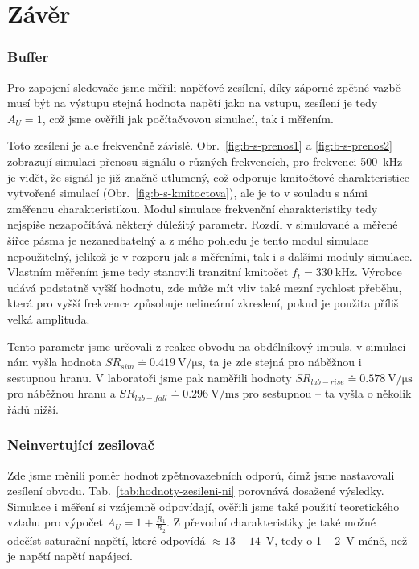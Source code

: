 \documentclass{protokol}
\begin{document}
\clearpage


\section{Závěr}
\subsubsection{Buffer}
Pro zapojení sledovače jsme měřili napěťové zesílení, díky záporné zpětné vazbě musí být na výstupu stejná hodnota napětí jako na vstupu, zesílení je tedy $ A_U=1 $, což jsme ověřili jak počítačvovou simulací, tak i měřením.

Toto zesílení je ale frekvenčně závislé. Obr.~\ref{fig:b-s-prenos1} a \ref{fig:b-s-prenos2} zobrazují simulaci přenosu signálu o různých frekvencích, pro frekvenci \qty{500}{\kilo\hertz} je vidět, že signál je již značně utlumený, což odporuje kmitočtové charakteristice vytvořené simulací (Obr.~\ref{fig:b-s-kmitoctova}), ale je to v souladu s námi změřenou charakteristikou. Modul simulace frekvenční charakteristiky tedy nejspíše nezapočítává některý důležitý parametr. Rozdíl v simulované a měřené šířce pásma je nezanedbatelný a z mého pohledu je tento modul simulace nepoužitelný, jelikož je v rozporu jak s měřeními, tak i s dalšími moduly simulace. Vlastním měřením jsme tedy stanovili tranzitní kmitočet $ f_t=\qty{330}{\kilo\hertz} $. Výrobce udává podstatně vyšší hodnotu, zde může mít vliv také mezní rychlost přeběhu, která pro vyšší frekvence způsobuje nelineární zkreslení, pokud je použita příliš velká amplituda.

Tento parametr jsme určovali z reakce obvodu na obdélníkový impuls, v simulaci nám vyšla hodnota $ SR_{sim}\doteq \qty{0.419}{\volt\per\micro\second} $, ta je zde stejná pro náběžnou i sestupnou hranu. V laboratoři jsme pak naměřili hodnoty $ SR_{lab - rise}\doteq \qty{0.578}{\volt\per\micro\second} $ pro náběžnou hranu a $ SR_{lab - fall}\doteq \qty{0.296}{\volt\per\milli\second} $ pro sestupnou -- ta vyšla o několik řádů nižší.

\subsubsection{Neinvertující zesilovač}
Zde jsme měnili poměr hodnot zpětnovazebních odporů, čímž jsme nastavovali zesílení obvodu. Tab.~\ref{tab:hodnoty-zesileni-ni} porovnává dosažené výsledky. Simulace i měření si vzájemně odpovídají, ověřili jsme také použití teoretického vztahu pro výpočet $ A_U = 1+\frac{R_1}{R_2} $. Z převodní charakteristiky je také možné odečíst saturační napětí, které odpovídá $ \approx 13-14 $\ V, tedy o 1 -- 2\ V méně, než je napětí napětí napájecí.%
%
\end{document}

